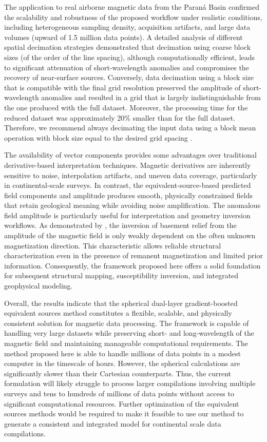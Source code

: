 \documentclass[a4paper,oneside,10pt]{book}
\begin{document}
The application to real airborne magnetic data from the Paraná Basin confirmed
the scalability and robustness of the proposed workflow under realistic
conditions, including heterogeneous sampling density, acquisition artifacts,
and large data volumes (upward of 1.5 million data points). A detailed analysis
of different spatial decimation strategies demonstrated that decimation using
coarse block sizes (of the order of the line spacing), although computationally
efficient, leads to significant attenuation of short-wavelength anomalies and
compromises the recovery of near-surface sources. Conversely, data decimation
using a block size that is compatible with the final grid resolution preserved
the amplitude of short-wavelength anomalies and resulted in a grid that is
largely indistinguishable from the one produced with the full dataset.
Moreover, the processing time for the reduced dataset was approximately 20\%
smaller than for the full dataset. Therefore, we recommend always decimating
the input data using a block mean operation with block size equal to the
desired grid spacing \citep{Smith1990}.

The availability of vector components provides some advantages over traditional
derivative-based interpretation techniques. Magnetic derivatives are inherently
sensitive to noise, interpolation artifacts, and uneven data coverage,
particularly in continental-scale surveys. In contrast, the
equivalent-source-based predicted field components and amplitude produces
smooth, physically constrained fields that retain geological meaning while
avoiding noise amplification.
The anomalous field amplitude is particularly useful for interpretation and
geometry inversion workflows.
As demonstrated by \citet{HidalgoGato2021},
the inversion of basement relief from the amplitude of the magnetic field
is only
weakly dependent on the often unknown magnetization direction. This characteristic
allows reliable structural characterization even in the presence of
remanent magnetization and limited prior information. Consequently, the
framework proposed here offers a solid foundation for subsequent structural
mapping, susceptibility inversion, and integrated geophysical modeling.

Overall, the results indicate that the spherical dual-layer
gradient-boosted equivalent sources method constitutes a flexible, scalable,
and physically consistent solution for magnetic data processing. The
framework is capable of handling very large datasets while preserving
short- and long-wavelength of the magnetic field and maintaining manageable computational
requirements.
The method proposed here is able to handle millions of
data points in a modest computer in the timescale of hours.
However, the spherical calculations are significantly slower than their
Cartesian counterparts.
Thus, the current formulation will likely struggle to process larger
compilations involving multiple surveys and tens to hundreds of millions of
data points without access to significant computational resources.
Further optimization of the equivalent sources methods would be required to
make it feasible to use our method to generate a consistent and integrated
model for continental scale data compilations.



\end{document}
